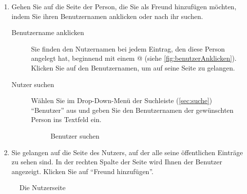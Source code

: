 \begin{enumerate} 
    \item Gehen Sie auf die Seite der Person, die Sie als Freund hinzufügen möchten, indem Sie ihren Benutzernamen anklicken oder nach ihr suchen.
		
		\begin{description}
		\item [Benutzername anklicken] Sie finden den Nutzernamen bei jedem Eintrag, den diese Person angelegt hat, beginnend mit einem @ (siehe \autoref{fig:benutzerAnklicken}). Klicken Sie auf den Benutzernamen, um auf seine Seite zu gelangen.
		
		\item [Nutzer suchen] Wählen Sie im Drop-Down-Menü der Suchleiste (\autoref{sec:suche}) \enquote{Benutzer} aus und geben Sie den Benutzernamen der gewünschten Person ins Textfeld ein.
		\begin{figure}[h!]
 \centering
 \caption{Benutzer suchen}
 \label{fig:benutzerSuchen}
\end{figure}

	\end{description}
    \item Sie gelangen auf die Seite des Nutzers, auf der alle seine öffentlichen Einträge zu sehen sind. In der rechten Spalte der Seite wird Ihnen der Benutzer angezeigt. Klicken Sie auf \enquote{Freund hinzufügen}.
\end{enumerate}

\begin{figure}[h!]
 \centering
 \caption{Die Nutzerseite}
 \label{fig:nutzerseite}
\end{figure}

